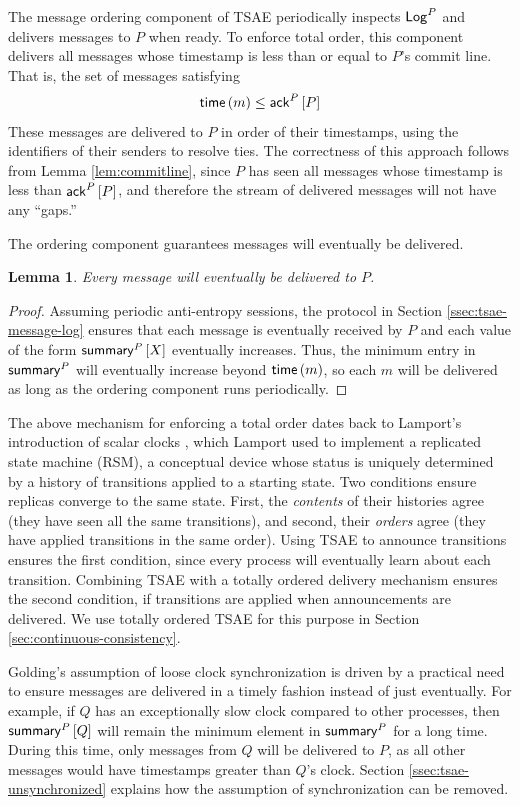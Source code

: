 \documentclass[]             %
{NASA}                       %
\newtheorem{lemma}[theorem]{Lemma}
\theoremstyle{definition}
\begin{document}
The message ordering component of TSAE periodically inspects $\mathsf{Log}^{P}$
and delivers messages to $P$ when ready. To enforce total order, this
component delivers all messages whose timestamp is less than or equal
to $P$'s commit line. That is, the set of messages satisfying
\begin{equation}
  \label{eq:tsae-message-ordering-condition}
  \mathsf{time}\left(m\right) \leq \mathsf{ack}^{P}\left[P\right]
\end{equation}
These messages are delivered to $P$ in order of their timestamps, using
the identifiers of their senders to resolve ties. The correctness of
this approach follows from Lemma \ref{lem:commitline}, since $P$ has
seen all messages whose timestamp is less than $\mathsf{ack}^{P}\left[P\right]$, and
therefore the stream of delivered messages will not have any ``gaps.''

The ordering component guarantees messages will eventually be
delivered.
\begin{lemma}
  Every message will eventually be delivered to $P$.
\end{lemma}
\begin{proof}
  Assuming periodic anti-entropy sessions, the protocol in Section
  \ref{ssec:tsae-message-log} ensures that each message is eventually
  received by $P$ and each value of the form $\mathsf{summary}^{P}\left[X\right]$
  eventually increases. Thus, the minimum entry in $\mathsf{summary}^{P}$
  will eventually increase beyond $\mathsf{time}\left(m\right)$, so each $m$ will be
  delivered as long as the ordering component runs periodically.
\end{proof}

The above mechanism for enforcing a total order dates back to
Lamport's introduction of scalar clocks \cite{1978:lamportclocks},
which Lamport used to implement a replicated state machine (RSM), a
conceptual device whose status is uniquely determined by a history of
transitions applied to a starting state. Two conditions ensure
replicas converge to the same state. First, the \emph{contents} of
their histories agree (they have seen all the same transitions), and
second, their \emph{orders} agree (they have applied transitions in
the same order). Using TSAE to announce transitions ensures the first
condition, since every process will eventually learn about each
transition. Combining TSAE with a totally ordered delivery mechanism
ensures the second condition, if transitions are applied when
announcements are delivered. We use totally ordered TSAE for this
purpose in Section \ref{sec:continuous-consistency}.

Golding's assumption of loose clock synchronization is driven by a
practical need to ensure messages are delivered in a timely fashion
instead of just eventually. For example, if $Q$ has an exceptionally
slow clock compared to other processes, then $\mathsf{summary}^{P}\left[Q\right]$ will
remain the minimum element in $\mathsf{summary}^{P}$ for a long time. During
this time, only messages from $Q$ will be delivered to $P$, as all
other messages would have timestamps greater than $Q$'s clock. Section
\ref{ssec:tsae-unsynchronized} explains how the assumption of
synchronization can be removed.
\end{document}
